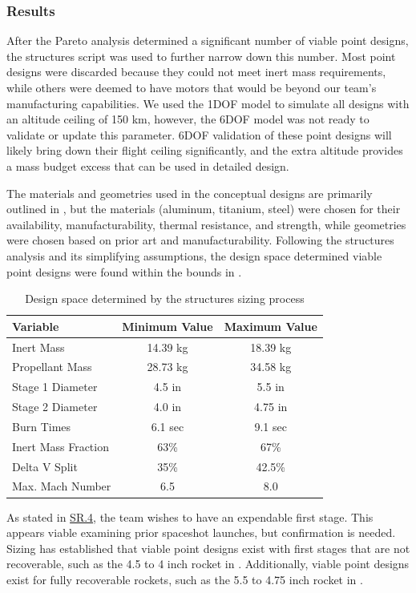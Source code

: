 \subsubsection{Results}
After the Pareto analysis determined a significant number of viable point designs, the structures script was used to further narrow down this number. Most point designs were discarded because they could not meet inert mass requirements, while others were deemed to have motors that would be beyond our team’s manufacturing capabilities. We used the 1DOF model to simulate all designs with an altitude ceiling of 150 km, however, the 6DOF model was not ready to validate or update this parameter. 6DOF validation of these point designs will likely bring down their flight ceiling significantly, and the extra altitude provides a mass budget excess that can be used in detailed design.

The materials and geometries used in the conceptual designs are primarily outlined in , but the materials (aluminum, titanium, steel) were chosen for their availability, manufacturability, thermal resistance, and strength, while geometries were chosen based on prior art and manufacturability. Following the structures analysis and its simplifying assumptions, the design space determined viable point designs were found within the bounds in .

\begin{table}
    \centering
    \begin{tabular}{l|c|c}
        \textbf{Variable} & \textbf{Minimum Value} & \textbf{Maximum Value} \\ \hline
        Inert Mass & 14.39 kg & 18.39 kg \\
        Propellant Mass & 28.73 kg & 34.58 kg \\
        Stage 1 Diameter & 4.5 in & 5.5 in \\
        Stage 2 Diameter & 4.0 in & 4.75 in \\
        Burn Times & 6.1 sec & 9.1 sec \\
        Inert Mass Fraction & 63\% & 67\% \\
        Delta V Split & 35\% & 42.5\% \\
        Max. Mach Number & 6.5 & 8.0
    \end{tabular}
    \caption{Design space determined by the structures sizing process}
    \label{table:sizing-bounds}
\end{table}


As stated in \hyperlink{SR.4}{SR.4}, the team wishes to have an expendable first stage. This appears viable examining prior spaceshot launches, but confirmation is needed. Sizing has established that viable point designs exist with first stages that are not recoverable, such as the 4.5 to 4 inch rocket in . Additionally, viable point designs exist for fully recoverable rockets, such as the 5.5 to 4.75 inch rocket in .

